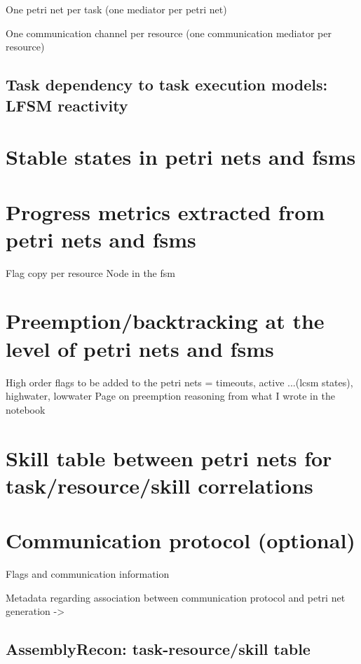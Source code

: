\documentclass[a4paper,10pt]{article}
\begin{document}
One petri net per task (one mediator per petri net)





One communication channel per resource (one communication mediator per resource)

\subsection{Task dependency to task execution models: LFSM reactivity}



\section{Stable states in petri nets and fsms}

\section{Progress metrics extracted from petri nets and fsms}

Flag copy per resource 
Node in the fsm


\section{Preemption/backtracking at the level of petri nets and fsms}

High order flags to be added to the petri nets = timeouts, active ...(lcsm states), highwater, lowwater 
Page on preemption reasoning from what I wrote in the notebook

\section{Skill table between petri nets for task/resource/skill correlations}

\section{Communication protocol (optional)}
Flags and communication information 

Metadata regarding association between communication protocol and petri net generation -> 


\subsection{AssemblyRecon: task-resource/skill table}
\end{document}
